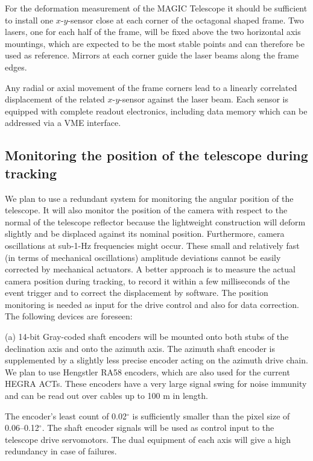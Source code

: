 For the deformation measurement of the MAGIC Telescope it should be
sufficient to install one $x$-$y$-sensor close at each corner of the
octagonal shaped frame. Two lasers, one for each half of the frame, will be
fixed above the two horizontal axis mountings, which are expected to be the
most stable points and can therefore be used as reference. Mirrors at each
corner guide the laser beams along the frame edges.

Any radial or axial movement of the frame corners lead to a linearly
correlated displacement of the related $x$-$y$-sensor against the laser
beam. Each sensor is equipped with complete readout electronics, including
data memory which can be addressed via a VME interface.


\subsection{Monitoring the position of the telescope during tracking}


\medskip We plan to use a redundant system for monitoring the angular
position of the telescope. It will also monitor the position of the camera
with respect to the normal of the telescope reflector because the lightweight
construction will deform slightly and be displaced against its nominal
position. Furthermore, camera oscillations at sub-1-Hz frequencies might
occur. These small and relatively fast (in terms of mechanical oscillations)
amplitude deviations cannot be easily corrected by mechanical actuators. A
better approach is to measure the actual camera position during tracking, to
record it within a few milliseconds of the event trigger and to correct the
displacement by software. The position monitoring is needed as input for the
drive control and also for data correction. The following devices are
foreseen:

(a) 14-bit Gray-coded shaft encoders will be mounted onto both stubs of the
declination axis and onto the azimuth axis. The azimuth shaft encoder is
supplemented by a slightly less precise encoder acting on the azimuth drive
chain. We plan to use Hengstler RA58 encoders, which are also used for the
current HEGRA ACTs. These encoders have a very large signal swing for noise
immunity and can be read out over cables up to 100 m in length.

The encoder's least count of 0.02$^\circ$ is sufficiently smaller than the
pixel size of 0.06--0.12$^\circ$. The shaft encoder signals will be used as
control input to the telescope drive servomotors. The dual equipment of each
axis will give a high redundancy in case of failures.

